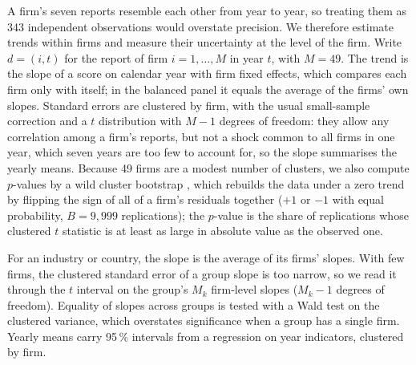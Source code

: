 A firm's seven reports resemble each other from year to year, so treating them
as 343 independent observations would overstate precision. We therefore
estimate trends within firms and measure their uncertainty at the level of the
firm. Write $d = (i, t)$ for the report of firm $i = 1, \dots, M$ in year $t$,
with $M = 49$. The trend is the slope of a score on calendar year with firm
fixed effects, which compares each firm only with itself; in the balanced
panel it equals the average of the firms' own slopes. Standard errors are
clustered by firm, with the usual small-sample correction and a $t$
distribution with $M - 1$ degrees of freedom: they allow any correlation among
a firm's reports, but not a shock common to all firms in one year, which seven
years are too few to account for, so the slope summarises the yearly means.
Because 49 firms are a modest number of clusters, we also compute $p$-values
by a wild cluster bootstrap \citep{cameron2008}, which rebuilds the data under
a zero trend by flipping the sign of all of a firm's residuals together ($+1$
or $-1$ with equal probability, $B = 9{,}999$ replications); the $p$-value is
the share of replications whose clustered $t$ statistic is at least as large
in absolute value as the observed one.

For an industry or country, the slope is the average of its firms' slopes.
With few firms, the clustered standard error of a group slope is too narrow,
so we read it through the $t$ interval on the group's $M_k$ firm-level slopes
($M_k - 1$ degrees of freedom). Equality of slopes across groups is tested
with a Wald test on the clustered variance, which overstates significance when
a group has a single firm. Yearly means carry 95\,\% intervals from a
regression on year indicators, clustered by firm.
